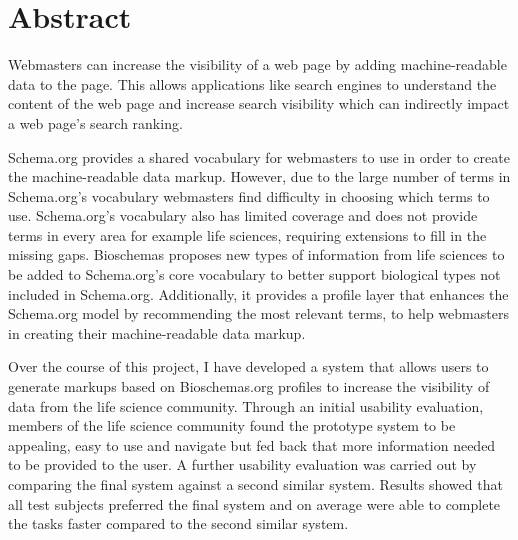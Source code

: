 \chapter*{Abstract}

Webmasters can increase the visibility of a web page by adding machine-readable data to the page. This allows applications like search engines to understand the content of the web page and increase search visibility which can indirectly impact a web page's search ranking. 

Schema.org provides a shared vocabulary for webmasters to use in order to create the machine-readable data markup. However, due to the large number of terms in Schema.org's vocabulary webmasters find difficulty in choosing which terms to use. Schema.org's vocabulary also has limited coverage and does not provide terms in every area for example life sciences, requiring extensions to fill in the missing gaps. Bioschemas proposes new types of information from life sciences to be added to Schema.org's core vocabulary to better support biological types not included in Schema.org. Additionally, it provides a profile layer that enhances the Schema.org model by recommending the most relevant terms,
to help webmasters in creating their machine-readable data markup.

Over the course of this project, I have developed a system that allows users to generate markups based on Bioschemas.org profiles to increase the visibility of data from the life science community. Through an initial usability evaluation, members of the life science community found the prototype system to be appealing, easy to use and navigate but fed back that more information needed to be provided to the user. A further usability evaluation was carried out by comparing the final system against a second similar system. Results showed that all test subjects preferred the final system and on average were able to complete the tasks faster compared to the second similar system.
